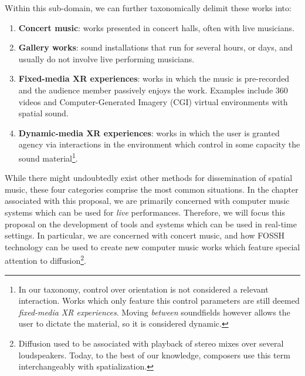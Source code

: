 Within this sub-domain, we can further taxonomically delimit these works into:
\begin{enumerate}
    \item \textbf{Concert music}: works presented in concert halls, often with live musicians. 
    \item \textbf{Gallery works}: sound installations that run for several hours, or days, and usually do not involve live performing musicians. 
    \item \textbf{Fixed-media XR experiences}: works in which the music is pre-recorded and the audience member passively enjoys the work. Examples include 360 videos and Computer-Generated Imagery (CGI) virtual environments with spatial sound. 
    \item \textbf{Dynamic-media XR experiences}: works in which the user is granted agency via interactions in the environment which control in some capacity the sound material\footnote{In our taxonomy, control over orientation is not considered a relevant interaction. Works which only feature this control parameters are still deemed \textit{fixed-media XR experiences}. Moving \textit{between} soundfields however allows the user to dictate the material, so it is considered dynamic.}.
\end{enumerate}

While there might undoubtedly exist other methods for dissemination of spatial music, these four categories comprise the most common situations. In the chapter associated with this proposal, we are primarily concerned with computer music systems which can be used for \textit{live} performances. Therefore, we will focus this proposal on the development of tools and systems which can be used in real-time settings. In particular, we are concerned with concert music, and how FOSSH technology can be used to create new computer music works which feature special attention to diffusion\footnote{Diffusion used to be associated with playback of stereo mixes over several loudspeakers. Today, to the best of our knowledge, composers use this term interchangeably with spatialization.}.




